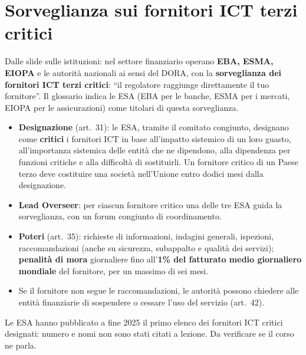 \section{Sorveglianza sui fornitori ICT terzi critici}
\label{sec:dora-oversight}

Dalle slide sulle istituzioni: nel settore finanziario operano \textbf{EBA, ESMA, EIOPA} e le autorità
nazionali ai sensi del DORA, con la \textbf{sorveglianza dei fornitori ICT terzi critici}: ``il
regolatore raggiunge direttamente il tuo fornitore''. Il glossario indica le ESA (EBA per le banche,
ESMA per i mercati, EIOPA per le assicurazioni) come titolari di questa sorveglianza.

\begin{integrazione}[artt.~31--44]
\begin{itemize}
  \item \textbf{Designazione} (art.~31): le ESA, tramite il comitato congiunto, designano come
    \textbf{critici} i fornitori ICT in base all'impatto sistemico di un loro guasto, all'importanza
    sistemica delle entità che ne dipendono, alla dipendenza per funzioni critiche e alla difficoltà di
    sostituirli. Un fornitore critico di un Paese terzo deve costituire una società nell'Unione entro
    dodici mesi dalla designazione.
  \item \textbf{Lead Overseer}: per ciascun fornitore critico una delle tre ESA guida la sorveglianza,
    con un forum congiunto di coordinamento.
  \item \textbf{Poteri} (art.~35): richieste di informazioni, indagini generali, ispezioni,
    raccomandazioni (anche su sicurezza, subappalto e qualità dei servizi); \textbf{penalità di mora}
    giornaliere fino all'\textbf{1\% del fatturato medio giornaliero mondiale} del fornitore, per un
    massimo di sei mesi.
  \item Se il fornitore non segue le raccomandazioni, le autorità possono chiedere alle entità
    finanziarie di sospendere o cessare l'uso del servizio (art.~42).
\end{itemize}
\end{integrazione}

\begin{verifica}
Le ESA hanno pubblicato a fine 2025 il primo elenco dei fornitori ICT critici designati: numero e nomi
non sono stati citati a lezione. Da verificare se il corso ne parla.
\end{verifica}

